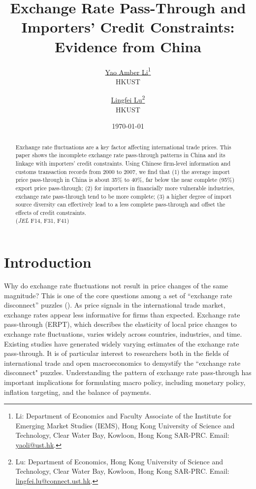 \documentclass[12pt]{article}
\begin{document}
\title{  \Large \textbf{Exchange Rate Pass-Through and Importers' Credit Constraints: Evidence from China}}

\author{\large \href{http://yaoli.people.ust.hk/}{Yao Amber Li}\thanks{Li: Department of Economics and Faculty Associate of the Institute for Emerging Market Studies (IEMS), Hong Kong University of Science and Technology, Clear Water Bay, Kowloon, Hong Kong SAR-PRC. Email: \href{mailto:yaoli@ust.hk}{yaoli@ust.hk}.}\\ \large{HKUST}
\and \large \href{}{Lingfei Lu}\thanks{Lu: Department of Economics, Hong Kong University of Science and Technology, Clear Water Bay, Kowloon, Hong Kong SAR-PRC. Email: \href{mailto:}{lingfei.lu@connect.ust.hk}.} \\ \large{HKUST}
 }

\date{\today }

\maketitle

\begin{abstract}
Exchange rate fluctuations are a key factor affecting international trade prices. This paper shows the incomplete exchange rate pass-through patterns in China and its linkage with importers' credit constraints. Using Chinese firm-level information and customs transaction records from 2000 to 2007, we find that (1) the average import price pass-through in China is about 35\% to 40\%, far below the near complete (95\%) export price pass-through; (2) for importers in financially more vulnerable industries, exchange rate pass-through tend to be more complete; (3) a higher degree of import source diversity can effectively lead to a less complete  pass-through and offset the effects of credit constraints.\\
(\textit{JEL} F14, F31, F41)

\end{abstract}

\section{Introduction} \label{Introduction}

Why do exchange rate fluctuations not result in price changes of the same magnitude? This is one of the core questions among a set of ``exchange rate disconnect'' puzzles (\cite{obstfeld2000}). As price signals in the international trade market, exchange rates appear less informative for firms than expected. Exchange rate pass-through (ERPT), which describes the elasticity of local price changes to exchange rate fluctuations, varies widely across countries, industries, and time. Existing studies have generated widely varying estimates of the exchange rate pass-through. It is of particular interest to researchers both in the fields of international trade and open macroeconomics to demystify the ``exchange rate disconnect" puzzles. Understanding the pattern of exchange rate pass-through has important implications for formulating macro policy, including monetary policy, inflation targeting, and the balance of payments.
\end{document}
